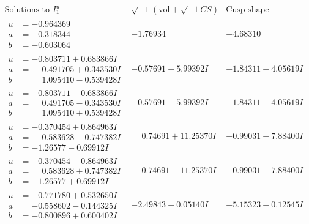 \documentclass[1p]{elsarticle_modified}
\theoremstyle{definition}
\newcommand{\I}{\sqrt{-1}}
\begin{document}
$$\begin{array}{c|c|c}  
\text{Solutions to }I^u_{1}& \I (\text{vol} + \sqrt{-1}CS) & \text{Cusp shape}\\
 \hline 
\begin{aligned}
u &= -0.964369\phantom{ +0.000000I} \\
a &= -0.318344\phantom{ +0.000000I} \\
b &= -0.603064\phantom{ +0.000000I}\end{aligned}
 & -1.76934\phantom{ +0.000000I} & -4.68310\phantom{ +0.000000I} \\ \hline\begin{aligned}
u &= -0.803711 + 0.683866 I \\
a &= \phantom{-}0.491705 + 0.343530 I \\
b &= \phantom{-}1.095410 - 0.539428 I\end{aligned}
 & -0.57691 - 5.99392 I & -1.84311 + 4.05619 I \\ \hline\begin{aligned}
u &= -0.803711 - 0.683866 I \\
a &= \phantom{-}0.491705 - 0.343530 I \\
b &= \phantom{-}1.095410 + 0.539428 I\end{aligned}
 & -0.57691 + 5.99392 I & -1.84311 - 4.05619 I \\ \hline\begin{aligned}
u &= -0.370454 + 0.864963 I \\
a &= \phantom{-}0.583628 - 0.747382 I \\
b &= -1.26577 - 0.69912 I\end{aligned}
 & \phantom{-}0.74691 + 11.25370 I & -0.99031 - 7.88400 I \\ \hline\begin{aligned}
u &= -0.370454 - 0.864963 I \\
a &= \phantom{-}0.583628 + 0.747382 I \\
b &= -1.26577 + 0.69912 I\end{aligned}
 & \phantom{-}0.74691 - 11.25370 I & -0.99031 + 7.88400 I \\ \hline\begin{aligned}
u &= -0.771780 + 0.532650 I \\
a &= -0.558602 - 0.144325 I \\
b &= -0.800896 + 0.600402 I\end{aligned}
 & -2.49843 + 0.05140 I & -5.15323 - 0.12545 I \\ \hline\begin{aligned}

\end{aligned}
\end{array}$$
\end{document}
